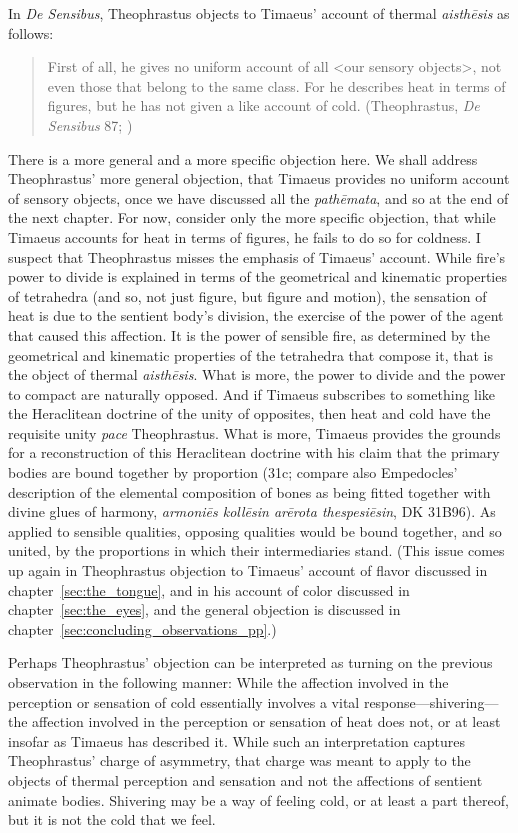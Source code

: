 In \emph{De Sensibus}, Theophrastus objects to Timaeus' account of thermal \emph{aisthēsis} as follows:
\begin{quote}
	First of all, he gives no uniform account of all <our sensory objects>, not even those that belong to the same class. For he describes heat in terms of figures, but he has not given a like account of cold. (Theophrastus, \emph{De Sensibus} 87; \citealt[147]{Stratton:1917vn})
\end{quote}
There is a more general and a more specific objection here. We shall address Theophrastus' more general objection, that Timaeus provides no uniform account of sensory objects, once we have discussed all the \emph{pathēmata}, and so at the end of the next chapter. For now, consider only the more specific objection, that while Timaeus accounts for heat in terms of figures, he fails to do so for coldness. I suspect that Theophrastus misses the emphasis of Timaeus' account. While fire's power to divide is explained in terms of the geometrical and kinematic properties of tetrahedra (and so, not just figure, but figure and motion), the sensation of heat is due to the sentient body's division, the exercise of the power of the agent that caused this affection. It is the power of sensible fire, as determined by the geometrical and kinematic properties of the tetrahedra that compose it, that is the object of thermal \emph{aisthēsis}. What is more, the power to divide and the power to compact are naturally opposed. And if Timaeus subscribes to something like the Heraclitean doctrine of the unity of opposites, then heat and cold have the requisite unity \emph{pace} Theophrastus. What is more, Timaeus provides the grounds for a reconstruction of this Heraclitean doctrine with his claim that the primary bodies are bound together by proportion (31c; compare also Empedocles' description of the elemental composition of bones as being fitted together with divine glues of harmony, \emph{armoniēs kollēsin arērota thespesiēsin}, DK 31B96). As applied to sensible qualities, opposing qualities would be bound together, and so united, by the proportions in which their intermediaries stand. (This issue comes up again in Theophrastus objection to Timaeus' account of flavor discussed in chapter~\ref{sec:the_tongue}, and in his account of color discussed in chapter~\ref{sec:the_eyes}, and the general objection is discussed in chapter~\ref{sec:concluding_observations_pp}.)

Perhaps Theophrastus' objection can be interpreted as turning on the previous observation in the following manner: While the affection involved in the perception or sensation of cold essentially involves a vital response---shivering---the affection involved in the perception or sensation of heat does not, or at least insofar as Timaeus has described it. While such an interpretation captures Theophrastus' charge of asymmetry, that charge was meant to apply to the objects of thermal perception and sensation and not the affections of sentient animate bodies. Shivering may be a way of feeling cold, or at least a part thereof, but it is not the cold that we feel.

